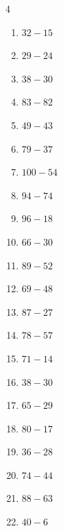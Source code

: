 \begin{multicols}{4}
\begin{enumerate}
  \item $32-15$
        \phantom{$=17$}

  \item $29-24$
        \phantom{$=5$}

  \item $38-30$
        \phantom{$=8$}

  \item $83-82$
        \phantom{$=1$}

  \item $49-43$
        \phantom{$=6$}

  \item $79-37$
        \phantom{$=42$}

  \item $100-54$
        \phantom{$=46$}

  \item $94-74$
        \phantom{$=20$}

  \item $96-18$
        \phantom{$=78$}

  \item $66-30$
        \phantom{$=36$}

  \item $89-52$
        \phantom{$=37$}

  \item $69-48$
        \phantom{$=21$}

  \item $87-27$
        \phantom{$=60$}

  \item $78-57$
        \phantom{$=21$}

  \item $71-14$
        \phantom{$=57$}

  \item $38-30$
        \phantom{$=8$}

  \item $65-29$
        \phantom{$=36$}

  \item $80-17$
        \phantom{$=63$}

  \item $36-28$
        \phantom{$=8$}

  \item $74-44$
        \phantom{$=30$}

  \item $88-63$
        \phantom{$=25$}

  \item $40-6$
        \phantom{$=34$}


\end{enumerate}
\end{multicols}
